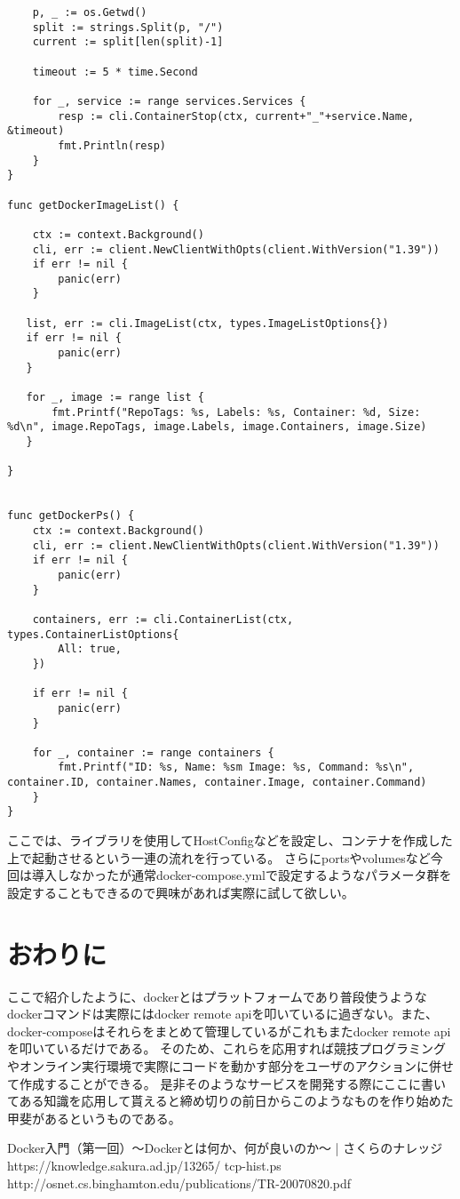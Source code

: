 \begin{verbatim}
    p, _ := os.Getwd()
    split := strings.Split(p, "/")
    current := split[len(split)-1]

    timeout := 5 * time.Second

    for _, service := range services.Services {
        resp := cli.ContainerStop(ctx, current+"_"+service.Name, &timeout)
        fmt.Println(resp)
    }
}

func getDockerImageList() {

    ctx := context.Background()
    cli, err := client.NewClientWithOpts(client.WithVersion("1.39"))
    if err != nil {
        panic(err)
    }

   list, err := cli.ImageList(ctx, types.ImageListOptions{})
   if err != nil {
        panic(err)
   }

   for _, image := range list {
       fmt.Printf("RepoTags: %s, Labels: %s, Container: %d, Size: %d\n", image.RepoTags, image.Labels, image.Containers, image.Size)
   }

}


func getDockerPs() {
    ctx := context.Background()
    cli, err := client.NewClientWithOpts(client.WithVersion("1.39"))
    if err != nil {
        panic(err)
    }

    containers, err := cli.ContainerList(ctx, types.ContainerListOptions{
        All: true,
    })

    if err != nil {
        panic(err)
    }

    for _, container := range containers {
        fmt.Printf("ID: %s, Name: %sm Image: %s, Command: %s\n", container.ID, container.Names, container.Image, container.Command)
    }
}
\end{verbatim}

ここでは、ライブラリを使用してHostConfigなどを設定し、コンテナを作成した上で起動させるという一連の流れを行っている。
さらにportsやvolumesなど今回は導入しなかったが通常docker-compose.ymlで設定するようなパラメータ群を設定することもできるので興味があれば実際に試して欲しい。

\section{おわりに}

ここで紹介したように、dockerとはプラットフォームであり普段使うようなdockerコマンドは実際にはdocker remote apiを叩いているに過ぎない。また、docker-composeはそれらをまとめて管理しているがこれもまたdocker remote apiを叩いているだけである。
そのため、これらを応用すれば競技プログラミングやオンライン実行環境で実際にコードを動かす部分をユーザのアクションに併せて作成することができる。
是非そのようなサービスを開発する際にここに書いてある知識を応用して貰えると締め切りの前日からこのようなものを作り始めた甲斐があるというものである。


\begin{thebibliography}{10}
     Docker入門（第一回）～Dockerとは何か、何が良いのか～ | さくらのナレッジ https://knowledge.sakura.ad.jp/13265/
     tcp-hist.ps http://osnet.cs.binghamton.edu/publications/TR-20070820.pdf
\end{thebibliography}
